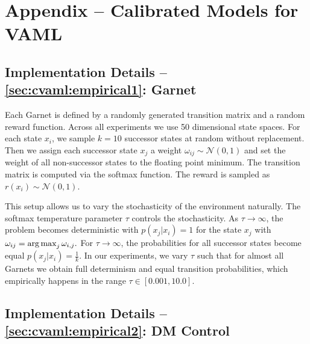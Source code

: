 \chapter{Appendix -- Calibrated Models for VAML}

\section{Implementation Details -- \autoref{sec:cvaml:empirical1}: Garnet}
\label{app:cvaml:model_design}

Each Garnet is defined by a randomly generated transition matrix and a random reward function.
Across all experiments we use 50 dimensional state spaces.
For each state $x_i$, we sample $k=10$ successor states at random without replacement.
Then we assign each successor state $x_j$ a weight $\omega_{ij} \sim \mathcal{N}(0, 1)$ and set the weight of all non-successor states to the floating point minimum.
The transition matrix is computed via the softmax function.
The reward is sampled as $r(x_i) \sim \mathcal{N}(0,1).$

This setup allows us to vary the stochasticity of the environment naturally.
The softmax temperature parameter $\tau$ controls the stochasticity.
As $\tau \rightarrow \infty$, the problem becomes deterministic with $p(x_j|x_i) = 1$ for the state $x_j$ with $\omega_{ij} = \operatorname*{arg\,max}_j \omega_{i,j}.$
For $\tau \rightarrow \infty$, the probabilities for all successor states become equal $p(x_j|x_i) = \frac{1}{k}.$
In our experiments, we vary $\tau$ such that for almost all Garnets we obtain full determinism and equal transition probabilities, which empirically happens in the range $\tau \in [0.001, 10.0].$

\section{Implementation Details --  \autoref{sec:cvaml:empirical2}: DM Control}
\label{app:model_design}

